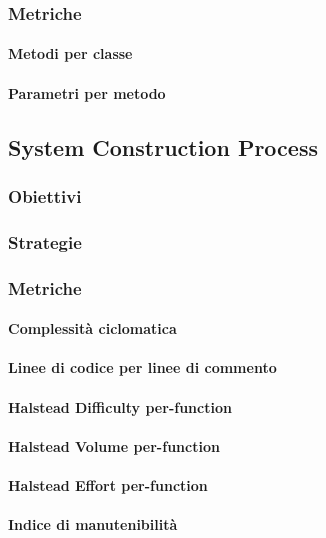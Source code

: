 		\subsubsection{Metriche}
			\paragraph{Metodi per classe}	
			\paragraph{Parametri per metodo}
			
	\subsection{System Construction Process}
		\subsubsection{Obiettivi}
		\subsubsection{Strategie}
		\subsubsection{Metriche}
			\paragraph{Complessità ciclomatica}	
			\paragraph{Linee di codice per linee di commento}
			\paragraph{Halstead Difficulty per-function}		
			\paragraph{Halstead Volume per-function}
			\paragraph{Halstead Effort per-function}
			\paragraph{Indice di manutenibilità}
			
